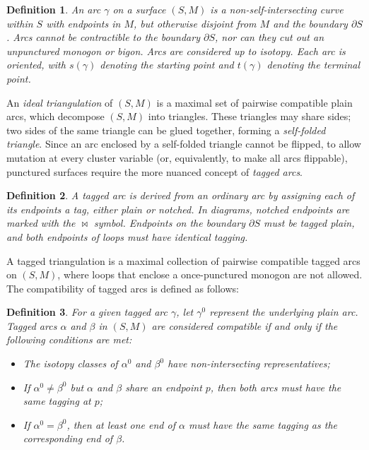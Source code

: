 \documentclass{article}
\newtheorem{definition}{Definition}
\theoremstyle{remark}
\begin{document}
\begin{definition}
An \emph{arc} $\gamma$ on a surface $(S,M)$ is a non-self-intersecting curve within \(S\) with endpoints in \(M\), but otherwise disjoint from \(M\) and the boundary $\partial S$. Arcs cannot be contractible to the boundary $\partial S$, nor can they cut out an unpunctured monogon or bigon. Arcs are considered up to isotopy. Each arc is oriented, with \(s(\gamma)\) denoting the \emph{starting point} and \(t(\gamma)\) denoting the \emph{terminal point}.
\end{definition}

An \emph{ideal triangulation} of $(S,M)$ is a maximal set of pairwise compatible plain arcs, which decompose $(S,M)$ into triangles. These triangles may share sides; two sides of the same triangle can be glued together, forming a \emph{self-folded triangle}. Since an arc enclosed by a self-folded triangle cannot be flipped, to allow mutation at every cluster variable (or, equivalently, to make all arcs flippable), punctured surfaces require the more nuanced concept of \emph{tagged arcs}.

\begin{definition}
A \emph{tagged arc} is derived from an ordinary arc by assigning each of its endpoints a tag, either \emph{plain} or \emph{notched}. In diagrams, notched endpoints are marked with the $\bowtie$ symbol. Endpoints on the boundary $\partial S$ must be tagged plain, and both endpoints of loops must have identical tagging.
\end{definition}

A tagged triangulation is a maximal collection of pairwise compatible tagged arcs on $(S,M)$, where loops that enclose a once-punctured monogon are not allowed. The compatibility of tagged arcs is defined as follows:

\begin{definition}
For a given tagged arc $\gamma$, let $\gamma^0$ represent the underlying plain arc. Tagged arcs $\alpha$ and $\beta$ in $(S,M)$ are considered \emph{compatible} if and only if the following conditions are met:
\begin{itemize}
    \item The isotopy classes of $\alpha^0$ and $\beta^0$ have non-intersecting representatives;
    \item If $\alpha^0 \neq \beta^0$ but $\alpha$ and $\beta$ share an endpoint $p$, then both arcs must have the same tagging at $p$;
    \item If $\alpha^0 = \beta^0$, then at least one end of $\alpha$ must have the same tagging as the corresponding end of $\beta$.
\end{itemize}    
\end{definition}
\end{document}
